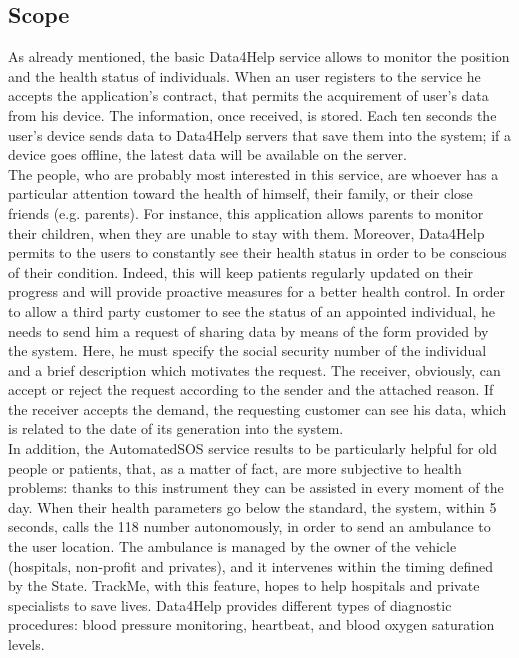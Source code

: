 \subsection{Scope}
As already mentioned, the basic Data4Help service allows to monitor the position and the health status of individuals. When an user registers to the service he accepts the application's contract, that permits the acquirement of user's data from his device. The information, once received, is stored. 
Each ten seconds the user's device sends data to Data4Help servers that save them into the system; if a device goes offline, the latest data will be available on the server.\\ 
The people, who are probably most interested in this service, are whoever has a particular attention toward the health of himself, their family, or their close friends (e.g. parents).
For instance, this application allows parents to monitor their children, when they are unable to stay with them. 
Moreover, Data4Help permits to the users to constantly see their health status in order to be conscious of their condition. Indeed, this will keep patients regularly updated on their progress and will provide proactive measures for a better health control. 
In order to allow a third party customer to see the status of an appointed individual, he needs to send him a request of sharing data by means of the form provided by the system. 
Here, he must specify the social security number of the individual and a brief description which motivates the request. 
The receiver, obviously, can accept or reject the request according to the sender and the attached reason. 
If the receiver accepts the demand, the requesting customer can see his data, which is related to the date of its generation into the system. \\ 
In addition, the AutomatedSOS service results to be particularly helpful for old people or patients, that, as a matter of fact, are more subjective to health problems: thanks to this instrument they can be assisted in every moment of the day. 
When their health parameters go below the standard, the system, within 5 seconds, calls the 118 number autonomously, in order to send an ambulance to the user location. 
The ambulance is managed by the owner of the vehicle (hospitals, non-profit and privates), and it intervenes within the timing defined by the State.
TrackMe, with this feature, hopes to help hospitals and private specialists to save lives.
Data4Help provides different types of diagnostic procedures: blood pressure monitoring, heartbeat, and blood oxygen saturation levels.\\ 
